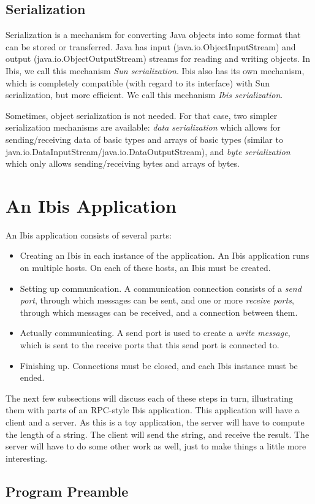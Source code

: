 \documentclass[10pt]{article}
\newcommand{\mysection}[1]{\section{#1}\label{#1}}
\newcommand{\mysubsection}[1]{\subsection{#1}\label{#1}}
\begin{document}
\mysubsection{Serialization}

Serialization is a mechanism for converting Java objects into some
format that can be stored or transferred.
Java has input (java.io.ObjectInputStream) and output
(java.io.ObjectOutputStream) streams for reading and writing objects.
In Ibis, we call this mechanism \emph{Sun serialization}.
Ibis also has its own mechanism, which is completely compatible
(with regard to its interface) with Sun serialization, but more efficient.
We call this mechanism \emph{Ibis serialization}.

Sometimes, object serialization is not needed. For that case, two simpler
serialization mechanisms are available: \emph{data serialization} which
allows for sending/receiving data of basic types and arrays of basic types
(similar to java.io.DataInputStream/java.io.DataOutputStream), and
\emph{byte serialization} which only allows sending/receiving bytes
and arrays of bytes.

\mysection{An Ibis Application}

An Ibis application consists of several parts:
\begin{itemize}
\item
Creating an Ibis in each instance of the application.
An Ibis application runs on multiple hosts. On each of these hosts, an Ibis
must be created.
\item
Setting up communication. A communication connection consists of a
\emph{send port}, through which messages can be sent, and one or
more \emph{receive ports},
through which messages can be received, and a connection between them.
\item
Actually communicating. A send port is used to create a 
\emph{write message}, which is sent to the receive ports that this send port
is connected to.
\item
Finishing up. Connections must be closed, and each Ibis instance must
be ended.
\end{itemize}

The next few subsections will discuss each of these steps in turn,
illustrating them with parts of an RPC-style Ibis application.
This application will have a client and a server. As this is a toy
application, the server will have to compute the length of a string.
The client will send the string, and receive the result.
The server will have to do some other work as well, just to make
things a little more interesting.

\subsection{Program Preamble}
\end{document}
